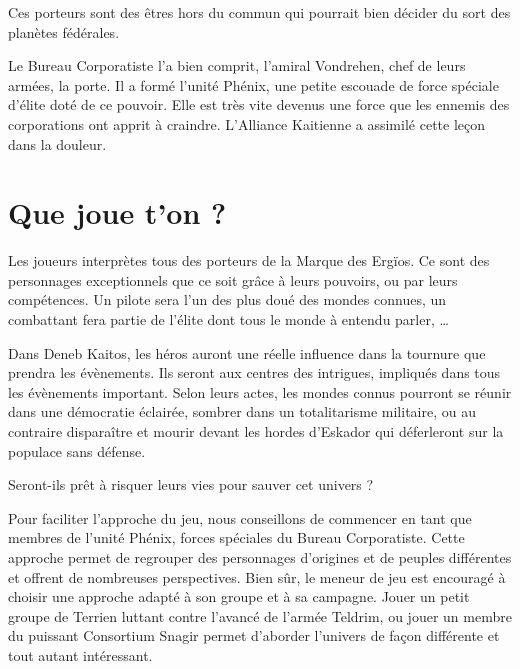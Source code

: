 \begin{multicols*}{2}
Ces porteurs sont des êtres hors du commun qui pourrait bien décider du sort des planètes fédérales. 

Le Bureau Corporatiste l'a bien comprit, l'amiral Vondrehen, chef de leurs armées, la porte. Il a formé l'unité Phénix, une petite escouade de force spéciale d'élite doté de ce pouvoir. Elle est très vite devenus une force que les ennemis des corporations ont apprit à craindre. L'Alliance Kaitienne a assimilé cette leçon dans la douleur.


\section*{Que joue t'on ?}

Les joueurs interprètes tous des porteurs de la Marque des Ergïos. Ce sont des personnages exceptionnels que ce soit grâce à leurs pouvoirs, ou par leurs compétences. Un pilote sera l'un des plus doué des mondes connues, un combattant fera partie de l'élite dont tous le monde à entendu parler, …

Dans Deneb Kaitos, les héros auront une réelle influence dans la tournure que prendra les évènements. Ils seront aux centres des intrigues, impliqués dans tous les évènements important. Selon leurs actes, les mondes connus pourront se réunir dans une démocratie éclairée, sombrer dans un totalitarisme militaire, ou au contraire disparaître et mourir devant les hordes d'Eskador qui déferleront sur la populace sans défense.

Seront-ils prêt à risquer leurs vies pour sauver cet univers ?

Pour faciliter l'approche du jeu, nous conseillons de commencer en tant que membres de l’unité Phénix, forces spéciales du Bureau Corporatiste. Cette approche permet de regrouper des personnages d'origines et de peuples différentes et offrent de nombreuses perspectives. Bien sûr, le meneur de jeu est encouragé à choisir une approche adapté à son groupe et à sa campagne. Jouer un petit groupe de Terrien luttant contre l'avancé de l'armée Teldrim, ou jouer un membre du puissant Consortium Snagir permet d'aborder l'univers de façon différente et tout autant intéressant.

\end{multicols*}
